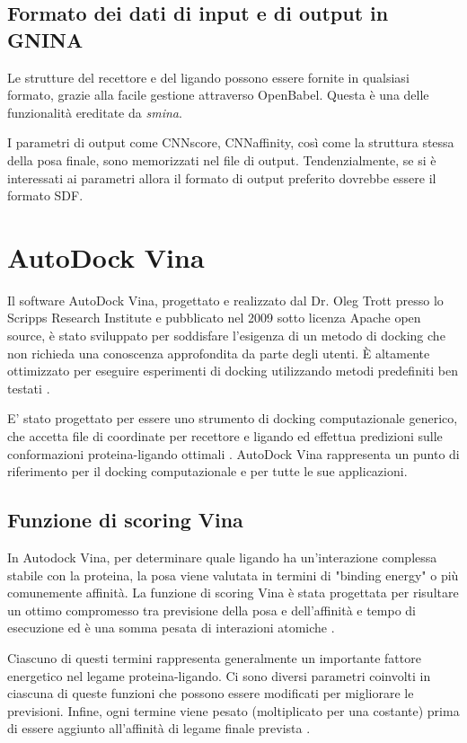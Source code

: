 \subsection{Formato dei dati di input e di output in GNINA}
Le strutture del recettore e del ligando possono essere fornite in qualsiasi formato, grazie alla facile gestione attraverso OpenBabel. Questa è una delle funzionalità ereditate da \textit{smina}. 

I parametri di output come CNNscore, CNNaffinity, così come la struttura stessa della posa finale, sono memorizzati nel file di output. Tendenzialmente, se si è interessati ai parametri allora il formato di output preferito dovrebbe essere il formato SDF.


\section{AutoDock Vina} 
Il software AutoDock Vina, progettato e realizzato dal Dr. Oleg Trott presso lo Scripps Research Institute e pubblicato nel 2009 sotto licenza Apache open source, è stato sviluppato per soddisfare l'esigenza di un metodo di docking che non richieda una conoscenza approfondita da parte degli utenti. È altamente ottimizzato per eseguire esperimenti di docking utilizzando metodi predefiniti ben testati  \cite{forli_computational_2016, eberhardt_autodock_nodate}. 

E' stato progettato per essere uno strumento di docking computazionale generico, che accetta file di coordinate per recettore e ligando ed effettua predizioni sulle conformazioni proteina-ligando ottimali \cite{forli_computational_2016}.
AutoDock Vina rappresenta un punto di riferimento per il docking computazionale e per tutte le sue applicazioni.

\subsection{Funzione di scoring Vina} \label{scoring_function_vina}
In Autodock Vina, per determinare quale ligando ha un'interazione complessa stabile con la proteina, la posa viene valutata in termini di "binding energy" o più comunemente affinità.
La funzione di scoring Vina è stata progettata per risultare un ottimo compromesso tra previsione della posa e dell'affinità e tempo di esecuzione ed è una somma pesata di interazioni atomiche \cite{koes_lessons_2013}. 

Ciascuno di questi termini rappresenta generalmente un importante fattore energetico nel legame proteina-ligando. 
Ci sono diversi parametri coinvolti in ciascuna di queste funzioni che possono essere modificati per migliorare le previsioni. Infine, ogni termine viene pesato (moltiplicato per una costante) prima di essere aggiunto all'affinità di legame finale prevista \cite{quiroga_vinardo_2016}. 

